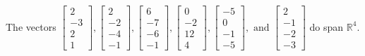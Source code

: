 \begin{exercise}
\begin{exerciseStatement}
  \end{exerciseStatement}
  \begin{exerciseAnswer}
   The vectors \(\left[\begin{array}{r}
2 \\
-3 \\
2 \\
1
\end{array}\right] , \left[\begin{array}{r}
2 \\
-2 \\
-4 \\
-1
\end{array}\right] , \left[\begin{array}{r}
6 \\
-7 \\
-6 \\
-1
\end{array}\right] , \left[\begin{array}{r}
0 \\
-2 \\
12 \\
4
\end{array}\right] , \left[\begin{array}{r}
-5 \\
0 \\
-1 \\
-5
\end{array}\right] , \text{ and } \left[\begin{array}{r}
2 \\
-1 \\
-2 \\
-3
\end{array}\right]\) 
  	 do  
	span \(\mathbb{R}^4\).
  


  \end{exerciseAnswer}
\end{exercise}